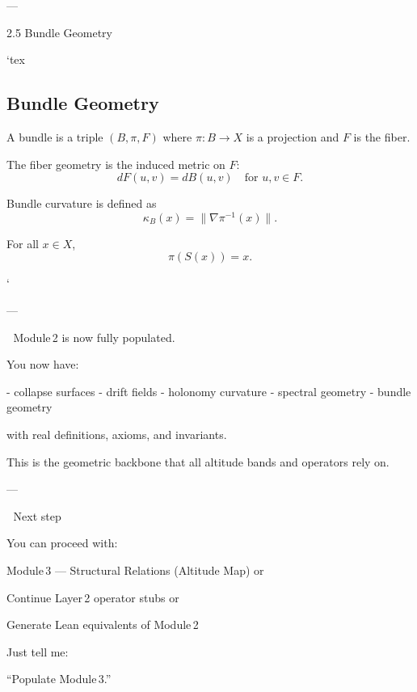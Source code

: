 ---

2.5 Bundle Geometry

`tex
\subsection{Bundle Geometry}

\begin{definition}[Bundle]
A bundle is a triple $(B, \pi, F)$ where $\pi : B \to X$ is a projection and
$F$ is the fiber.
\end{definition}

\begin{definition}
The fiber geometry is the induced metric on $F$:
\[
dF(u,v) = dB(u,v) \quad \text{for } u,v \in F.
\]
\end{definition}

\begin{definition}
Bundle curvature is defined as
\[
\kappa_B(x) = \| \nabla \pi^{-1}(x) \|.
\]
\end{definition}

\begin{axiom}
For all $x \in X$,
\[
\pi(S(x)) = x.
\]
\end{axiom}
`

---

🎯 Module 2 is now fully populated.

You now have:

- collapse surfaces  
- drift fields  
- holonomy curvature  
- spectral geometry  
- bundle geometry  

with real definitions, axioms, and invariants.

This is the geometric backbone that all altitude bands and operators rely on.

---

🚀 Next step

You can proceed with:

Module 3 — Structural Relations (Altitude Map)
or  

Continue Layer 2 operator stubs
or  

Generate Lean equivalents of Module 2

Just tell me:

“Populate Module 3.”

